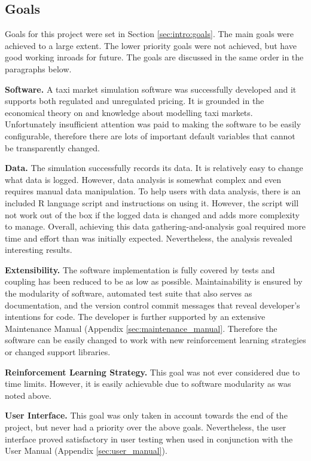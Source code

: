 \subsection{Goals}

Goals for this project were set in Section \ref{sec:intro:goals}. The main
goals were achieved to a large extent. The lower priority goals were not
achieved, but have good working inroads for future. The goals are discussed in the same order in the paragraphs below.

\textbf{Software.} A taxi market simulation software was successfully developed
and it supports both regulated and unregulated pricing. It is grounded in the
economical theory on  and knowledge about modelling taxi markets. Unfortunately
insufficient attention was paid to making the software to be easily
configurable, therefore there are lots of important default variables that
cannot be transparently changed.

\textbf{Data.} The simulation successfully records its data. It is
relatively easy to change what data is logged. However, data analysis is
somewhat complex and even requires manual data manipulation. To help users with
data analysis, there is an included R language script and instructions on using
it. However, the script will not work out of the box if the logged data is
changed and adds more complexity to manage. Overall, achieving this data
gathering-and-analysis goal required more time and effort than was initially
expected. Nevertheless, the analysis revealed interesting results.

\textbf{Extensibility.} The software implementation is fully covered by tests
and coupling has been reduced to be as low as possible. Maintainability is
ensured by the modularity of software, automated test suite that also serves as
documentation, and the version control commit messages that reveal developer's
intentions for code. The developer is further supported by an extensive
Maintenance Manual (Appendix \ref{sec:maintenance_manual}. Therefore the
software can be easily changed to work with new reinforcement learning
strategies or changed support libraries.

\textbf{Reinforcement Learning Strategy.} This goal was not ever considered due
to time limits. However, it is easily achievable due to software modularity as
was noted above.

\textbf{User Interface.} This goal was only taken in account towards the end of
the project, but never had a priority over the above goals. Nevertheless, the
user interface proved satisfactory in user testing when used in conjunction
with the User Manual (Appendix \ref{sec:user_manual}).


